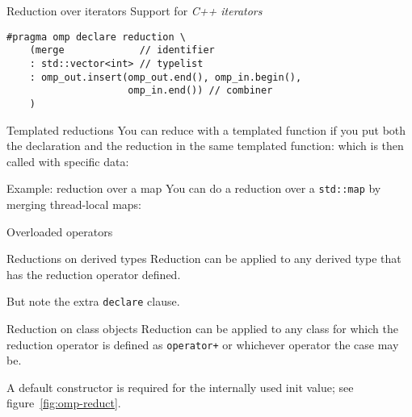 \begin{cppnote}{Reduction over iterators}
  Support for
  \emph{C++ iterators}
\begin{lstlisting}
#pragma omp declare reduction \
    (merge             // identifier 
    : std::vector<int> // typelist
    : omp_out.insert(omp_out.end(), omp_in.begin(), 
                     omp_in.end()) // combiner
    ) 
\end{lstlisting}
\end{cppnote}

\begin{cppnote}{Templated reductions}
  You can reduce with a templated function
  if you put both the declaration and the reduction
  in the same templated function:
  which is then called with specific data:
\end{cppnote}

\begin{cppnote}{Example: reduction over a map}
  You can do a reduction over a \lstinline{std::map}
  by merging thread-local maps:
  \begin{multicols}{2}
    \columnbreak
  \end{multicols}
\end{cppnote}

\Level 1 {Overloaded operators}

\begin{fortrannote}{Reductions on derived types}
  Reduction can be applied to any derived type that has the
  reduction operator defined.
  \begin{multicols}{2}
    \fverbatimsnippet{ftypeopdef}
    \columnbreak
    \fverbatimsnippet{ftypeopuse}
  \end{multicols}
  But note the extra \lstinline{declare} clause.  
\end{fortrannote}

\begin{cppnote}{Reduction on class objects}
  Reduction can be applied to any class for which the
  reduction operator is defined as \lstinline{operator+}
  or whichever operator the case may be.
  \begin{multicols}{2}
    \let\snippetoutputsize\footnotesize
    \columnbreak
  \end{multicols}
  A default constructor is required for the
  internally used init value;
  see figure~\ref{fig:omp-reduct}.
\end{cppnote}

